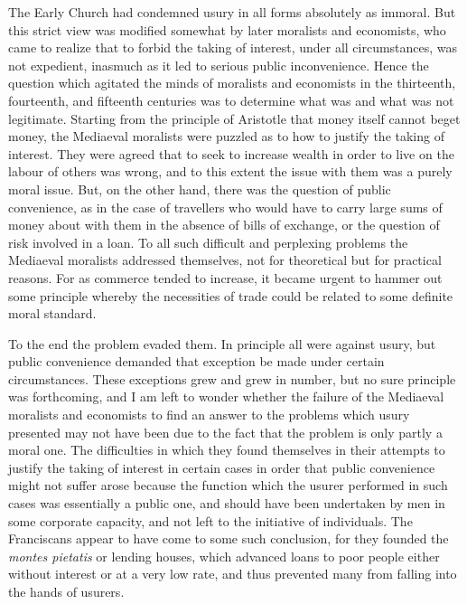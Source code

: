 \documentclass{book}
\begin{document}
The Early Church had condemned usury in all forms absolutely as immoral. But this strict view was modified somewhat by later moralists and economists, who came to realize that to forbid the taking of interest, under all circumstances, was not expedient, inasmuch as it led to serious public inconvenience. Hence the question which agitated the minds of moralists and economists in the thirteenth, fourteenth, and fifteenth centuries was to determine what was and what was not legitimate. Starting from the principle of Aristotle that money itself cannot beget money, the Mediaeval moralists were puzzled as to how to justify the taking of interest. They were agreed that to seek to increase wealth in order to live on the labour of others was wrong, and to this extent the issue with them was a purely moral issue. But, on the other hand, there was the question of public convenience, as in the case of travellers who would have to carry large sums of money about with them in the absence of bills of exchange, or the question of risk involved in a loan. To all such difficult and perplexing problems the Mediaeval moralists addressed themselves, not for theoretical but for practical reasons. For as commerce tended to increase, it became urgent to hammer out some principle whereby the necessities of trade could be related to some definite moral standard.

To the end the problem evaded them. In principle all were against usury, but public convenience demanded that exception be made under certain circumstances. These exceptions grew and grew in number, but no sure principle was forthcoming, and I am left to wonder whether the failure of the Mediaeval moralists and economists to find an answer to the problems which usury presented may not have been due to the fact that the problem is only partly a moral one. The difficulties in which they found themselves in their attempts to justify the taking of interest in certain cases in order that public convenience might not suffer arose because the function which the usurer performed in such cases was essentially a public one, and should have been undertaken by men in some corporate capacity, and not left to the initiative of individuals. The Franciscans appear to have come to some such conclusion, for they founded the \emph{montes pietatis} or lending houses, which advanced loans to poor people either without interest or at a very low rate, and thus prevented many from falling into the hands of usurers.
\end{document}
